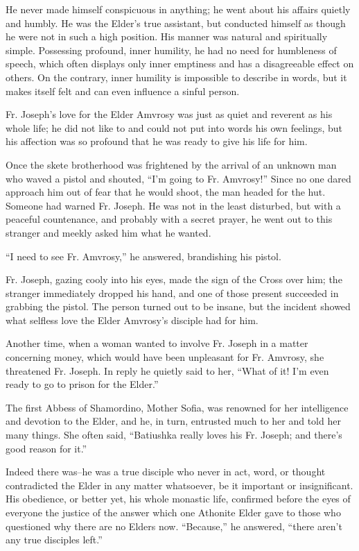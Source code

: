 He never made himself conspicuous in anything; he went about his affairs quietly and humbly. He was the Elder's true assistant, but conducted himself as though he were not in such a high position. His manner was natural and spiritually simple. Possessing profound, inner humility, he had no need for humbleness of speech, which often displays only inner emptiness and has a disagreeable effect on others. On the contrary, inner humility is impossible to describe in words, but it makes itself felt and can even influence a sinful person.

Fr. Joseph's love for the Elder Amvrosy was just as quiet and reverent as his whole life; he did not like to and could not put into words his own feelings, but his affection was so profound that he was ready to give his life for him.

Once the skete brotherhood was frightened by the arrival of an unknown man who waved a pistol and shouted, ``I'm going to Fr. Amvrosy!'' Since no one dared approach him out of fear that he would shoot, the man headed for the hut. Someone had warned Fr. Joseph. He was not in the least disturbed, but with a peaceful countenance, and probably with a secret prayer, he went out to this stranger and meekly asked him what he wanted.

``I need to see Fr. Amvrosy,'' he answered, brandishing his pistol.

Fr. Joseph, gazing cooly into his eyes, made the sign of the Cross over him; the stranger immediately dropped his hand, and one of those present succeeded in grabbing the pistol. The person turned out to be insane, but the incident showed what selfless love the Elder Amvrosy's disciple had for him.

Another time, when a woman wanted to involve Fr. Joseph in a matter concerning money, which would have been unpleasant for Fr. Amvrosy, she threatened Fr. Joseph. In reply he quietly said to her, ``What of it! I'm even ready to go to prison for the Elder.''

The first Abbess of Shamordino, Mother Sofia, was renowned for her intelligence and devotion to the Elder, and he, in turn, entrusted much to her and told her many things. She often said, ``Batiushka really loves his Fr. Joseph; and there's good reason for it.''

Indeed there was--he was a true disciple who never in act, word, or thought contradicted the Elder in any matter whatsoever, be it important or insignificant. His obedience, or better yet, his whole monastic life, confirmed before the eyes of everyone the justice of the answer which one Athonite Elder gave to those who questioned why there are no Elders now. ``Because,'' he answered, ``there aren't any true disciples left.''


